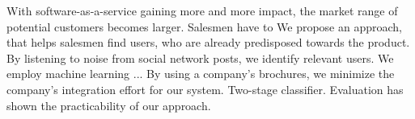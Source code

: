 
With software-as-a-service gaining more and more impact, the market range of potential customers becomes larger.
Salesmen have to 
We propose an approach, that helps salesmen find users, who are already predisposed towards the product.
By listening to noise from social network posts, we identify relevant users.
We employ machine learning ...
By using a company's brochures, we minimize the company's integration effort for our system.
Two-stage classifier.
Evaluation has shown the practicability of our approach.

